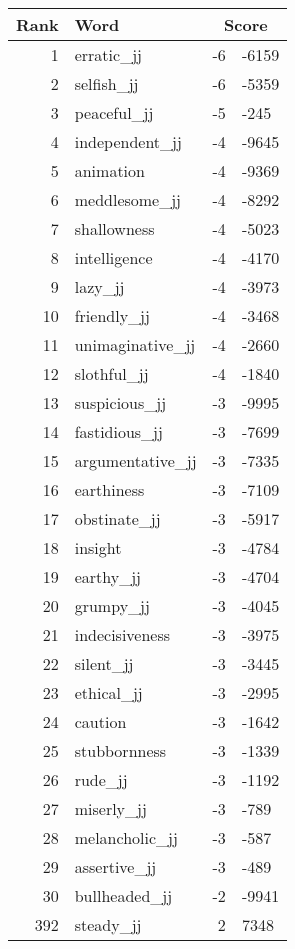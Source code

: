 \begin{longtable}[!htbp]{| rlr@{.}l |}
    \hline
    \textbf{Rank} & \textbf{Word} & \multicolumn{2}{c|}{\textbf{Score}} \\
    \hline
    \endhead
    1 & erratic\_jj & -6 & -6159 \\
    2 & selfish\_jj & -6 & -5359 \\
    3 & peaceful\_jj & -5 & -245 \\
    4 & independent\_jj & -4 & -9645 \\
    5 & animation & -4 & -9369 \\
    6 & meddlesome\_jj & -4 & -8292 \\
    7 & shallowness & -4 & -5023 \\
    8 & intelligence & -4 & -4170 \\
    9 & lazy\_jj & -4 & -3973 \\
    10 & friendly\_jj & -4 & -3468 \\
    11 & unimaginative\_jj & -4 & -2660 \\
    12 & slothful\_jj & -4 & -1840 \\
    13 & suspicious\_jj & -3 & -9995 \\
    14 & fastidious\_jj & -3 & -7699 \\
    15 & argumentative\_jj & -3 & -7335 \\
    16 & earthiness & -3 & -7109 \\
    17 & obstinate\_jj & -3 & -5917 \\
    18 & insight & -3 & -4784 \\
    19 & earthy\_jj & -3 & -4704 \\
    20 & grumpy\_jj & -3 & -4045 \\
    21 & indecisiveness & -3 & -3975 \\
    22 & silent\_jj & -3 & -3445 \\
    23 & ethical\_jj & -3 & -2995 \\
    24 & caution & -3 & -1642 \\
    25 & stubbornness & -3 & -1339 \\
    26 & rude\_jj & -3 & -1192 \\
    27 & miserly\_jj & -3 & -789 \\
    28 & melancholic\_jj & -3 & -587 \\
    29 & assertive\_jj & -3 & -489 \\
    30 & bullheaded\_jj & -2 & -9941 \\
    392 & steady\_jj & 2 & 7348 \\

\end{longtable}
